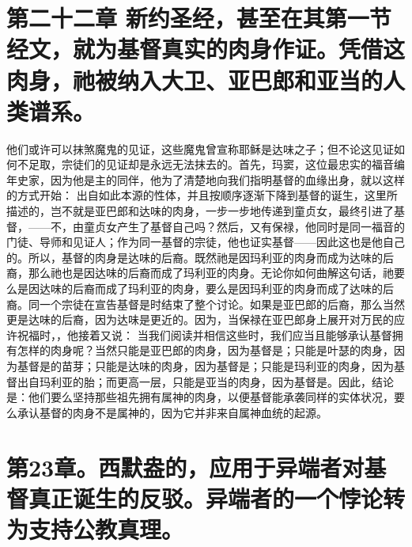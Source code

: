 
\section{第二十二章 新约圣经，甚至在其第一节经文，就为基督真实的肉身作证。凭借这肉身，祂被纳入大卫、亚巴郎和亚当的人类谱系。}

他们或许可以抹煞魔鬼的见证，这些魔鬼曾宣称耶稣是达味之子；但不论这见证如何不足取，宗徒们的见证却是永远无法抹去的。首先，玛窦，这位最忠实的福音编年史家，因为他是主的同伴，他为了清楚地向我们指明基督的血缘出身，就以这样的方式开始：  出自如此本源的性体，并且按顺序逐渐下降到基督的诞生，这里所描述的，岂不就是亚巴郎和达味的肉身，一步一步地传递到童贞女，最终引进了基督，——不，由童贞女产生了基督自己吗？然后，又有保禄，他同时是同一福音的门徒、导师和见证人；作为同一基督的宗徒，他也证实基督——因此这也是他自己的。所以，基督的肉身是达味的后裔。既然祂是因玛利亚的肉身而成为达味的后裔，那么祂也是因达味的后裔而成了玛利亚的肉身。无论你如何曲解这句话，祂要么是因达味的后裔而成了玛利亚的肉身，要么是因玛利亚的肉身而成了达味的后裔。同一个宗徒在宣告基督是时结束了整个讨论。如果是亚巴郎的后裔，那么当然更是达味的后裔，因为达味是更近的。因为，当保禄在亚巴郎身上展开对万民的应许祝福时，，他接着又说：  当我们阅读并相信这些时，我们应当且能够承认基督拥有怎样的肉身呢？当然只能是亚巴郎的肉身，因为基督是；只能是叶瑟的肉身，因为基督是的苗芽；只能是达味的肉身，因为基督是；只能是玛利亚的肉身，因为基督出自玛利亚的胎；而更高一层，只能是亚当的肉身，因为基督是。因此，结论是：他们要么坚持那些祖先拥有属神的肉身，以便基督能承袭同样的实体状况，要么承认基督的肉身不是属神的，因为它并非来自属神血统的起源。\par


\section{第23章。西默盎的，应用于异端者对基督真正诞生的反驳。异端者的一个悖论转为支持公教真理。}

